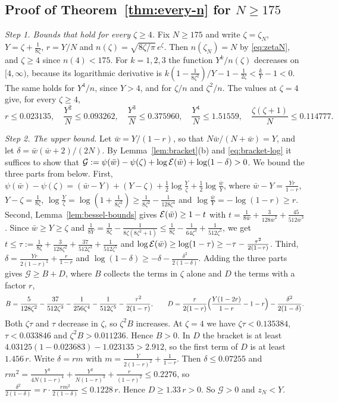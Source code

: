 \subsection{Proof of Theorem~\ref{thm:every-n} for \texorpdfstring{$N\ge175$}{N >= 175}}\label{app:every-n-large}

\emph{Step 1. Bounds that hold for every $\zeta\ge4$.} Fix $N\ge175$ and write
$\zeta=\zeta_N$, $Y=\zeta+\frac1{8\zeta}$, $r=Y/N$ and
$n(\zeta)=\sqrt{8\zeta/\pi}\,e^\zeta$. Then $n(\zeta_N)=N$ by
\eqref{eq:zetaN}, and $\zeta\ge4$ since $n(4)<175$. For $k=1,2,3$ the function
$Y^k/n(\zeta)$ decreases on $[4,\infty)$, because its logarithmic derivative is
$k(1-\frac1{8\zeta^2})/Y-1-\frac1{2\zeta}<\frac kY-1<0$. The same holds for
$Y^4/n$, since $Y>4$, and for $\zeta/n$ and $\zeta^2/n$. The values at
$\zeta=4$ give, for every $\zeta\ge4$,
\[
r\le0.023135,\quad\frac{Y^2}N\le0.093262,\quad\frac{Y^3}N\le0.375960,\quad
\frac{Y^4}N\le1.51559,\quad\frac{\zeta(\zeta+1)}N\le0.114777 .
\]

\emph{Step 2. The upper bound.} Let $\bar w=Y/(1-r)$, so that $N\bar w/(N+\bar w)=Y$, and let
$\delta=\bar w(\bar w+2)/(2N)$. By Lemma~\ref{lem:bracket}(b) and \eqref{eq:bracket-log}
it suffices to show that $\mathcal G:=\psi(\bar w)-\psi(\zeta)+\log \mathcal E(\bar w)+\log(1-\delta)>0$.
We bound the three parts from below. First,
$\psi(\bar w)-\psi(\zeta)=(\bar w-Y)+(Y-\zeta)+\frac12\log\frac Y\zeta+\frac12\log\frac{\bar w}Y$,
where $\bar w-Y=\frac{Yr}{1-r}$, $Y-\zeta=\frac1{8\zeta}$,
$\log\frac Y\zeta=\log(1+\frac1{8\zeta^2})\ge\frac1{8\zeta^2}-\frac1{128\zeta^4}$
and $\log\frac{\bar w}Y=-\log(1-r)\ge r$. Second, Lemma~\ref{lem:bessel-bounds} gives
$\mathcal E(\bar w)\ge1-t$ with $t=\frac1{8\bar w}+\frac3{128\bar w^2}+\frac{45}{512\bar w^3}$. Since
$\bar w\ge Y\ge\zeta$ and
$\frac1{8Y}=\frac1{8\zeta}-\frac1{8\zeta(8\zeta^2+1)}\le\frac1{8\zeta}-\frac1{64\zeta^3}+\frac1{512\zeta^5}$,
we get
$t\le\tau:=\frac1{8\zeta}+\frac3{128\zeta^2}+\frac{37}{512\zeta^3}+\frac1{512\zeta^5}$
and $\log \mathcal E(\bar w)\ge\log(1-\tau)\ge-\tau-\frac{\tau^2}{2(1-\tau)}$. Third,
$\delta=\frac{Yr}{2(1-r)^2}+\frac r{1-r}$ and
$\log(1-\delta)\ge-\delta-\frac{\delta^2}{2(1-\delta)}$. Adding the three parts
gives $\mathcal G\ge B+D$, where $B$ collects the terms in $\zeta$ alone and $D$ the
terms with a factor $r$,
\[
B=\frac5{128\zeta^2}-\frac{37}{512\zeta^3}-\frac1{256\zeta^4}-\frac1{512\zeta^5}-\frac{\tau^2}{2(1-\tau)},\qquad
D=\frac r{2(1-r)}\Bigl(\frac{Y(1-2r)}{1-r}-1-r\Bigr)-\frac{\delta^2}{2(1-\delta)} .
\]
Both $\zeta\tau$ and $\tau$ decrease in $\zeta$, so $\zeta^2B$ increases. At
$\zeta=4$ we have $\zeta\tau<0.135384$, $\tau<0.033846$ and
$\zeta^2B>0.011236$. Hence $B>0$. In $D$ the bracket is at least
$4.03125(1-0.023683)-1.023135>2.912$, so the first term of $D$ is at least
$1.456\,r$. Write $\delta=rm$ with $m=\frac Y{2(1-r)^2}+\frac1{1-r}$. Then
$\delta\le0.07255$ and
$rm^2=\frac{Y^3}{4N(1-r)^4}+\frac{Y^2}{N(1-r)^3}+\frac r{(1-r)^2}\le0.2276$, so
$\frac{\delta^2}{2(1-\delta)}=r\cdot\frac{rm^2}{2(1-\delta)}\le0.1228\,r$.
Hence $D\ge1.33\,r>0$. So $\mathcal G>0$ and $z_N<Y$.

